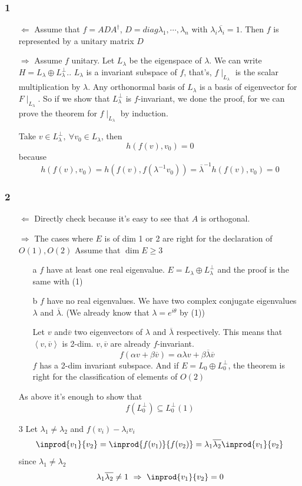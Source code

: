 \documentclass{book}
\begin{document}
\subsubsection{1}
\begin{itemize}
    \item [$\Leftarrow$]Assume that $f=ADA^\dagger $, $D=diag{\lambda_1,\cdots,\lambda_n}$ with $\lambda_i\overline{\lambda_i}=1$. Then $f$ is represented by a unitary matrix $D$
    \item [$\Rightarrow$]Assume $f$ unitary. Let $L_\lambda$ be the eigenspace of $\lambda$. We can write $H=L_\lambda\oplus L_\lambda^\bot.$. $L_\lambda$ is a invariant subspace of $f$, that's, $f\mid_{L_\lambda}$ is the scalar multiplication by $\lambda$. Any orthonormal basis of $L_\lambda$ is a basis of eigenvector for $F\mid_{L_\lambda}$. So if we show that $L_\lambda^\bot$ is $f$-invariant, we done the proof, for we can prove the theorem for $f\mid_{L_\lambda}$ by induction.
    
    Take $v\in L_\lambda^\bot,\ \forall v_0\in L_\lambda$, then $$h(f(v),v_0)=0$$ because$$h(f(v),v_0)=h(f(v),f(\lambda^{-1}v_0))=\overline{\lambda}^{-1}h(f(v),v_0)=0$$    
\end{itemize}
\subsubsection{2}\begin{itemize}
    \item [$\Leftarrow$]Directly check because it's easy to see that $A$ is orthogonal.
    \item [$\Rightarrow$]The cases where $E$ is of dim 1 or 2 are right for the declaration of $O(1),O(2)$ Assume that $\dim E\geq 3$
    \begin{itemize}
        \item [a]$f$ have at least one real eigenvalue. $E=L_\lambda\oplus L_\lambda^\bot$ and the proof is the same with (1)
        \item [b]$f$ have no real eigenvalues. We have two complex conjugate eigenvalues $\lambda$ and $\overline{\lambda}$. (We already know that $\lambda=e^{i\theta}$ by (1))
        
        Let $v$ and$\overline{v}$ two eigenvectors of $\lambda$ and $\overline{\lambda}$ respectively. This means that $\left<v,\overline{v}\right>$ is 2-dim. $v,\overline{v}$ are already $f$-invariant.$$f(\alpha v+\beta \overline{v})=\alpha\lambda v+\beta\overline \lambda\overline{v}$$
        $f$ has a 2-dim invariant subspace. And if $E=L_0\oplus L_0^\bot$, the theorem is right for the classification of elements of $O(2)$
    \end{itemize}
    As above it's enough to show that $$f(L_0^\bot)\subseteq L_0^\bot(1)$$
    \item[3]Let $\lambda_1\neq\lambda_2$ and $f(v_i)-\lambda_iv_i$$$\inprod{v_1}{v_2}=\inprod{f(v_1)}{f(v_2)}=\lambda_1\overline{\lambda_2}\inprod{v_1}{v_2}$$
    since $\lambda_1\neq\lambda_2$$$\lambda_1\overline{\lambda_2}\neq 1\ \Rightarrow\ \inprod{v_1}{v_2}=0$$
\end{itemize}
\end{document}
